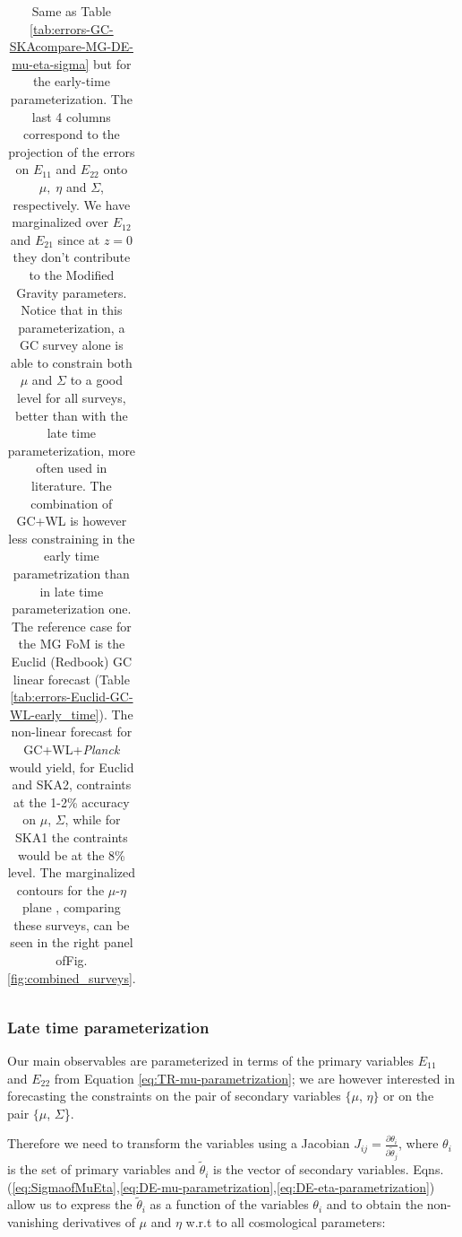 \begin{table}[htbp]
\begin{tabular}{|l|c|c|c|c|c||c|c|c|c|}
\hline
\end{tabular}
\small
\caption[1$\sigma$ marginalized errors for Euclid, DESI-ELG, SKA1 and SKA2 forecasts in the early-time parameterization.]{\label{tab:errors-GC-SKAcompare-MG-TR-mu-eta-sigma-Zhao-1}
Same as Table \ref{tab:errors-GC-SKAcompare-MG-DE-mu-eta-sigma} but for the early-time parameterization.
The last 4 columns correspond to the
projection of the errors on $E_{11}$ and $E_{22}$ onto $\mu,\;\eta$ and $\Sigma$, respectively. 
We have marginalized over $E_{12}$
and $E_{21}$ since at $z=0$ they don't contribute to the Modified
Gravity parameters. Notice that in this
parameterization, a GC survey alone is able to constrain both $\mu$ and $\Sigma$ to a good level for all surveys, better than with the late time parameterization, more often used in literature. The combination of GC+WL is however less constraining in the early time parametrization than in late time parameterization one. The reference case for the MG FoM is the Euclid (Redbook) GC linear forecast (Table \ref{tab:errors-Euclid-GC-WL-early_time}).
The non-linear forecast for GC+WL+{\it Planck} would yield, for Euclid and SKA2, contraints at the 1-2\% accuracy on $\mu$, $\Sigma$, while
for SKA1 the contraints would be at the 8\% level. The marginalized contours for the $\mu$-$\eta$ plane , comparing these surveys, can be seen in the right panel ofFig.\ref{fig:combined_surveys}.
}
\end{table}
\normalsize


\subsubsection{Late time parameterization}
Our main observables are parameterized
in terms of the primary variables $E_{11}$ and $E_{22}$ from Equation
\ref{eq:TR-mu-parametrization}; we are however interested in forecasting
the constraints on the pair of secondary variables $\{\mu$, $\eta\}$
or on the pair $\{\mu$, $\Sigma$\}.

Therefore we need to transform the variables using a Jacobian
$J_{ij}=\frac{\partial\theta_{i}}{\partial\tilde{\theta}_{j}}$,
where $\theta_{i}$ is the set of primary variables and $\tilde{\theta}_{i}$
is the vector of secondary variables. 
Eqns. (\ref{eq:SigmaofMuEta},\ref{eq:DE-mu-parametrization},\ref{eq:DE-eta-parametrization})
allow us to express the $\tilde{\theta}_{i}$ as a function of the variables $\theta_{i}$ and 
to obtain the non-vanishing derivatives
of $\mu$ and $\eta$ w.r.t to all cosmological parameters:

